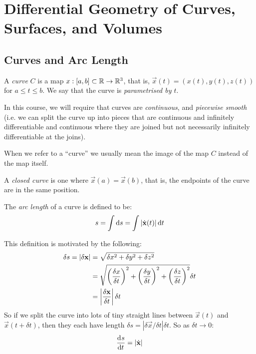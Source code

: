 \documentclass[../main.tex]{subfiles}
\begin{document}
\chapter{Differential Geometry of Curves, Surfaces, and Volumes}
\section{Curves and Arc Length}
\begin{definition}[Curve]
  A \textit{curve} $C$ is a map $x: [a, b] \subset \mathbb{R} \to \mathbb{R}^3$, that is, $\vec{x}(t) = (x(t), y(t), z(t))$ for $a \leq t \leq b$.
  We say that the curve is \textit{parametrised by $t$}.
\end{definition}
\begin{remark}
  In this course, we will require that curves are \textit{continuous}, and \textit{piecewise smooth} (i.e. we can split the curve up into pieces that are continuous and infinitely differentiable and continuous  where they are joined but not necessarily infinitely differentiable at the joins).
\end{remark}
When we refer to a ``curve'' we usually mean the image of the map $C$ instead of the map itself.
\begin{definition}
  A \textit{closed curve} is one where $\vec{x}(a) = \vec{x}(b)$, that is, the endpoints of the curve are in the same position.
\end{definition}
\begin{definition}
  The \textit{arc length} of a curve is defined to be:
  \[
    s = \int \d{s} = \int |\dot{\vec{x}}(t)| \d{t}
  \]
\end{definition}
This definition is motivated by the following:
\begin{align*}
  \delta s = |\delta \mathbf{\bm{x}}| &= \sqrt{\delta x^2 + \delta y^2 + \delta z^2} \\
                              &= \sqrt{\left(\frac{\delta x}{\delta t}\right)^2 + \left(\frac{\delta y}{\delta t}\right)^2 + \left(\frac{\delta z}{\delta t}\right)^2} \delta t \\
                              &= \left\lvert \frac{\delta \mathbf{\bm{x}}}{\delta t} \right\rvert \delta t
\end{align*}
\label{arcLength}
So if we split the curve into lots of tiny straight lines between $\vec{x}(t)$ and $\vec{x}(t + \delta t)$, then they each have length $\delta s = |\delta \vec{x}/\delta t|\delta t$.
So as $\delta t \to 0$:
\[
  \deriv{s}{t} = |\dot{\vec{x}}|
\] \label{naturalParam}\par
\end{document}
